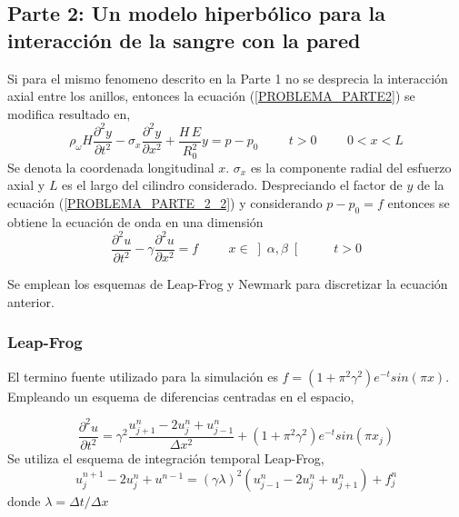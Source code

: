 
\subsection{Parte 2: Un modelo hiperbólico para la interacción de la sangre con la pared}

Si para el mismo fenomeno descrito en la Parte 1 no se desprecia la interacción axial entre los anillos, entonces la ecuación (\ref{PROBLEMA_PARTE2}) se modifica resultado en,
\begin{equation} \label{PROBLEMA_PARTE_2_2}
\rho_\omega H \dfrac{\partial^2 y}{\partial t^2} - \sigma_x \dfrac{\partial^2 y}{\partial x^2} + \dfrac{H \, E}{R_0^2} y = p-p_0 \hspace{1cm} t>0 \hspace{1cm} 0<x<L
\end{equation}
Se denota la coordenada longitudinal $x$. $\sigma_x$ es la componente radial del esfuerzo axial y $L$ es el largo del cilindro considerado. Despreciando el factor de $y$ de la ecuación (\ref{PROBLEMA_PARTE_2_2}) y considerando $p-p_0 = f$ entonces se obtiene la ecuación de onda en una dimensión
\begin{equation} \label{E_ONDA}
\dfrac{\partial^2 u}{\partial t^2} - \gamma \dfrac{\partial^2 u}{\partial x^2} = f \hspace{1cm} x \in \left] \alpha , \beta \right[ \hspace{1cm} t>0
\end{equation}

Se emplean los esquemas de Leap-Frog y Newmark para discretizar la ecuación anterior.

\subsubsection{Leap-Frog}

El termino fuente utilizado para la simulación es $ f = ( 1 + \pi^2 \gamma^2 ) e^{-t} sin( \pi x ) $. Empleando un esquema de diferencias centradas en el espacio,

\begin{equation}
\dfrac{ \partial^2 u }{ \partial t^2 } = \gamma^2 \dfrac{ u_{j+1}^n - 2 u_j^n + u_{j-1}^n }{ \Delta x ^2} + 
 ( 1 + \pi^2 \gamma^2 ) e^{-t} sin( \pi x_j ) 
\end{equation}
Se utiliza el esquema de integración temporal Leap-Frog,
\begin{equation}
u^{n+1}_j - 2u^n_j + u^{n-1} = (\gamma \lambda)^2 ( u^n_{j-1} -2 u^n_j + u^n_{j+1} ) + f^n_j
\end{equation}
donde $\lambda= \Delta t / \Delta x$

